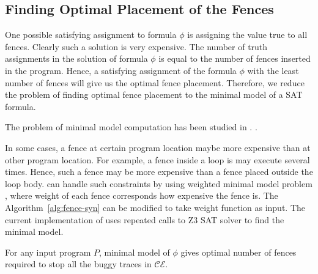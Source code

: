 \subsection{Finding Optimal Placement of the Fences}
One possible satisfying assignment to formula $ \phi $ is assigning the 
value true to all fences. Clearly such a solution is very expensive.
The number of truth assignments in the solution of formula $ \phi $ is 
equal to the number of fences inserted in the program.
Hence, a satisfying assignment of the formula $ \phi $ with the least 
number of fences will give us the optimal fence placement. 
Therefore, we reduce the problem of finding optimal fence placement to the 
minimal model of a SAT formula. 

The problem of minimal model computation has been studied in 
. .

In some cases, a fence at certain program location maybe more expensive 
than at other program location. For example, a fence inside a loop is may 
execute several times. Hence, such a fence may be more expensive than a 
fence placed outside the loop body.
%
\ourtechnique can handle such constraints by using weighted minimal model 
problem , where weight of each fence 
corresponds how expensive the fence is. 
The Algorithm~\ref{alg:fence-syn} can be modified to take weight 
function as input. 
%
The current implementation of \ourtechnique uses repeated calls to Z3 SAT 
solver to find the minimal model. 


\begin{theorem}
	For any input program $ P $, minimal model of $ \phi $ gives optimal
	number of fences required to stop all the buggy traces in 
	$ \mathcal{CE} $.
\end{theorem}

